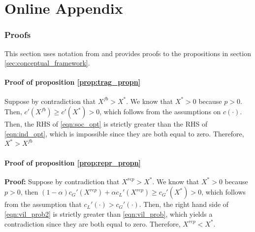 \documentclass[12pt,reqno]{article}
\begin{document}


\printbibliography

\newpage
\renewcommand{\thetable}{A\arabic{table}}
\renewcommand{\thefigure}{A\arabic{figure}}
\setcounter{table}{0}
\setcounter{figure}{0}

\appendix

\part{Online Appendix}
\parttoc 
\begin{refsection}


\clearpage
\section{Proofs}\label{sec:tragedy_model}

This section uses notation from and provides proofs to the propositions in section \ref{sec:conceptual_framework}.

\subsection{Proof of proposition \ref{prop:trag_propn}} %
\label{ssub:proof_to_proposition_prop:trag_propn}


Suppose by contradiction that $X^{fb} >
X^*$. We know that $X^* > 0$ because $p> 0$. Then, $c'(X^{fb}) \geq
c'(X^*) > 0$, which follows from the assumptions on $c(\cdot)$. Then,
the RHS of \ref{eqn:soc_opt} is strictly greater than the RHS of
\ref{eqn:ind_opt}, which is impossible since they are both equal to
zero. Therefore,  $X^* > X^{fb}$

\subsection{Proof of proposition \ref{prop:repr_propn}} %
\label{ssub:proof_to_proposition_prop:repr_propn}

\textbf{Proof:} Suppose by contradiction that $X^{rep} > X^*$. We know
that $X^{*} > 0$ because $p> 0$, then $(1-\alpha) c_G'(X^{rep}) +
\alpha c_L'(X^{rep}) \geq c_G'(X^*) > 0$, which follows from the
assumption that $c_L'(\cdot) > c_G'(\cdot)$. Then, the right hand side
of \ref{eqn:vil_prob2} is strictly greater than \ref{eqn:vil_prob},
which yields a contradiction since they are both equal to zero. 
Therefore, $X^{rep} < X^{*}$.


\end{refsection}
\end{document}
